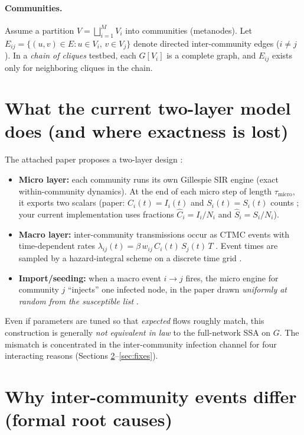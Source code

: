 \documentclass[11pt,a4paper]{article}
\begin{document}
\paragraph{Communities.}
Assume a partition $V=\bigsqcup_{i=1}^M V_i$ into communities (metanodes). Let
$E_{ij}=\{(u,v)\in E: u\in V_i,\, v\in V_j\}$ denote directed inter-community edges
($i\ne j$). In a \emph{chain of cliques} testbed, each $G[V_i]$ is a complete graph, and $E_{ij}$ exists
only for neighboring cliques in the chain.

\section{What the current two-layer model does (and where exactness is lost)}

The attached paper proposes a two-layer design \cite{paper}:

\begin{itemize}[leftmargin=*]
\item \textbf{Micro layer:} each community runs its own Gillespie SIR engine (exact within-community dynamics).
At the end of each micro step of length $\tau_{\text{micro}}$, it exports two scalars (paper: $C_i(t)=I_i(t)$
and $S_i(t)=S_i(t)$ counts \cite{paper}; your current implementation uses fractions
$\hat C_i=I_i/N_i$ and $\hat S_i=S_i/N_i$).
\item \textbf{Macro layer:} inter-community transmissions occur as CTMC events with time-dependent rates
$\lambda_{ij}(t)=\beta\,w_{ij}\,C_i(t)\,S_j(t)\,T$ \cite{paper}. Event times are sampled by a hazard-integral
scheme on a discrete time grid \cite{paper}.
\item \textbf{Import/seeding:} when a macro event $i\to j$ fires, the micro engine for community $j$ ``injects''
one infected node, in the paper drawn \emph{uniformly at random from the susceptible list}
\cite{paper}.
\end{itemize}

Even if parameters are tuned so that \emph{expected} flows roughly match, this construction is generally
\emph{not equivalent in law} to the full-network SSA on $G$. The mismatch is concentrated in the
inter-community infection channel for four interacting reasons (Sections \ref{sec:rootcauses}--\ref{sec:fixes}).

\section{Why inter-community events differ (formal root causes)}
\label{sec:rootcauses}
\end{document}
